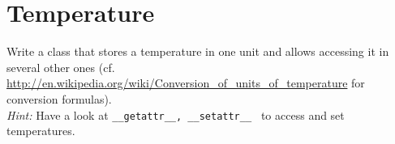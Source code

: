 \documentclass[12pt]{scrartcl}
\begin{document}

\section{Temperature}

Write a class that stores a temperature in one unit and allows accessing it in
several other ones
(cf. \url{http://en.wikipedia.org/wiki/Conversion_of_units_of_temperature} for
conversion formulas).\\
\emph{Hint:} Have a look at \texttt{\_\_getattr\_\_, \_\_setattr\_\_ } to
access and set temperatures.
\end{document}
